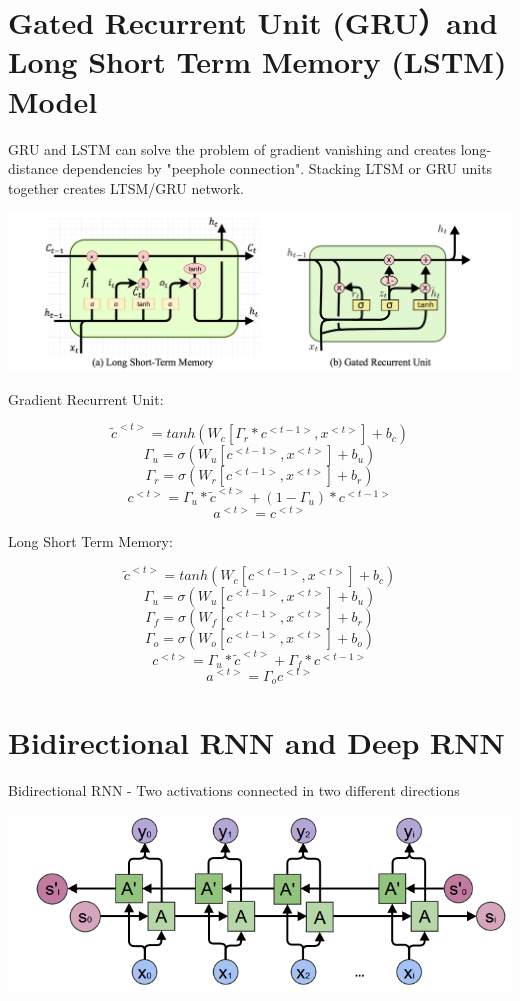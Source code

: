 \documentclass[11pt, openany]{book}              %
\begin{document}
\section{Gated Recurrent Unit (GRU）and Long Short Term Memory (LSTM) Model}

GRU and LSTM can solve the problem of gradient vanishing and creates long-distance dependencies by "peephole connection". Stacking LTSM or GRU units together creates LTSM/GRU network.

\includegraphics[width=15cm]{GRU-LSTM.png}

Gradient Recurrent Unit:

$$\tilde{c}^{<t>} = tanh( W_c [ \Gamma_r * c^{<t-1>},x^{<t>}] + b_c)$$
$$ \Gamma_u = \sigma(W_u[c^{<t-1>},x^{<t>}] + b_u)$$
$$ \Gamma_r = \sigma(W_r[c^{<t-1>},x^{<t>}] + b_r)$$
$$c^{<t>} = \Gamma_u * \tilde{c}^{<t>} + (1 - \Gamma_u) * c^{<t-1>}$$
$$a^{<t>} = c^{<t>}$$

Long Short Term Memory:

$$\tilde{c}^{<t>} = tanh( W_c [ c^{<t-1>},x^{<t>}] + b_c)$$
$$ \Gamma_u = \sigma(W_u[c^{<t-1>},x^{<t>}] + b_u)$$
$$ \Gamma_f = \sigma(W_f[c^{<t-1>},x^{<t>}] + b_r)$$
$$\Gamma_o = \sigma(W_o[c^{<t-1>},x^{<t>}] + b_o)$$
$$c^{<t>} = \Gamma_u * \tilde{c}^{<t>} + \Gamma_f * c^{<t-1>}$$
$$a^{<t>} = \Gamma_o c^{<t>}$$

\section{Bidirectional RNN and Deep RNN}

Bidirectional RNN - Two activations connected in two different directions

\includegraphics[width=15cm]{Bidirectional.png}
\end{document}
